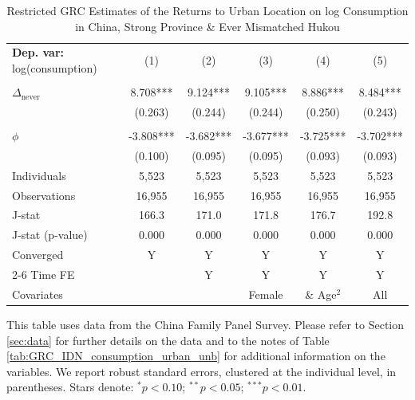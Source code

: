 \begin{table}[htbp] \centering \begin{threeparttable}
 \caption{Restricted GRC Estimates of the Returns to Urban Location on log Consumption in China, Strong Province & Ever Mismatched Hukou} 
 \label{tab:GRC_CHN_s_m_consumption_urban_unb} 
\begin{tabular}{l ccccc} \toprule  \textbf{Dep. var:}  log(consumption) 
                    &\multicolumn{1}{c}{(1)}   &\multicolumn{1}{c}{(2)}   &\multicolumn{1}{c}{(3)}   &\multicolumn{1}{c}{(4)}   &\multicolumn{1}{c}{(5)}   \\
                    &               &               &               &               &               \\
\addlinespace
$\Delta_{\text{never}}$&       8.708***&       9.124***&       9.105***&       8.886***&       8.484***\\
                    &     (0.263)   &     (0.244)   &     (0.244)   &     (0.250)   &     (0.243)   \\
                    &               &               &               &               &               \\
\addlinespace
$\phi$              &      -3.808***&      -3.682***&      -3.677***&      -3.725***&      -3.702***\\
                    &     (0.100)   &     (0.095)   &     (0.095)   &     (0.093)   &     (0.093)   \\
\addlinespace
Individuals         &       5,523   &       5,523   &       5,523   &       5,523   &       5,523   \\
Observations        &      16,955   &      16,955   &      16,955   &      16,955   &      16,955   \\
J-stat              &       166.3   &       171.0   &       171.8   &       176.7   &       192.8   \\
J-stat (p-value)    &       0.000   &       0.000   &       0.000   &       0.000   &       0.000   \\
Converged           &           Y   &           Y   &           Y   &           Y   &           Y   \\
\cmidrule{2-6} Time FE & & Y & Y & Y & Y \\ Covariates & & & Female & \& Age$^2$ & All \\ \bottomrule \end{tabular} \begin{tablenotes}[flushleft] \footnotesize \item{This table uses data from the China Family Panel Survey. Please refer to Section \ref{sec:data} for further details on the data and to the notes of Table \ref{tab:GRC_IDN_consumption_urban_unb} for additional information on the variables. We report robust standard errors, clustered at the individual level, in parentheses. Stars denote: $^{*} p<0.10$; $^{**} p<0.05$; $^{***} p<0.01$.} \end{tablenotes} \end{threeparttable} \end{table}
